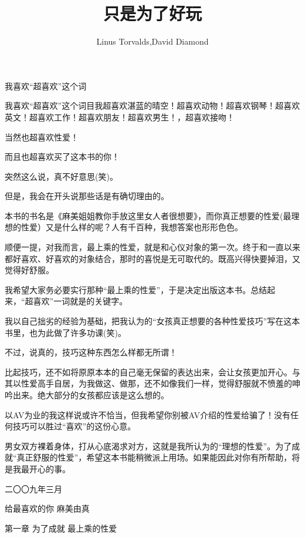 \documentclass[12pt,UTF8]{ctexbook}
\title{\heiti\zihao{0} 只是为了好玩}
\author{Linus Torvalds,David Diamond}
\date{}
\begin{document}
\maketitle
\tableofcontents

\frontmatter

\chapter{}



\mainmatter

我喜欢“超喜欢”这个词

我喜欢“超喜欢”这个词目我超喜欢湛蓝的晴空！超喜欢动物！超喜欢钢琴！超喜欢英文！超喜欢工作！超喜欢朋友！超喜欢男生！，超喜欢接吻！

当然也超喜欢性爱！

而且也超喜欢买了这本书的你！

突然这么说，真不好意思(笑)。

但是，我会在开头说那些话是有确切理由的。

本书的书名是《麻美姐姐教你手放这里女人者很想要》，而你真正想要的性爱(最理想的性爱）又是什么样的呢？人有千百种，我想答案也形形色色。

顺便一提，对我而言，最上乘的性爱，就是和心仪对象的第一次。终于和一直以来都好喜欢、好喜欢的对象结合，那时的喜悦是无可取代的。既高兴得快要掉泪，又觉得好舒服。

我希望大家务必要实行那种“最上乘的性爱”，于是决定出版这本书。总结起来，“超喜欢”一词就是的关键字。

我以自己拙劣的经验为基础，把我认为的“女孩真正想要的各种性爱技巧”写在这本书里，也为此做了许多功课(笑)。

不过，说真的，技巧这种东西怎么样都无所谓！

比起技巧，还不如将原原本本的自己毫无保留的表达出来，会让女孩更加开心。与其以性爱高手自居，为我做这、做那，还不如像我们一样，觉得舒服就不愤羞的呻吟出来。绝大部分的女孩都应该是这么想的。

以AV为业的我这样说或许不恰当，但我希望你别被AV介绍的性爱给骗了！没有任何技巧可以胜过“喜欢”的这份心意。

男女双方裸着身体，打从心底渴求对方，这就是我所认为的“理想的性爱”。为了成就“真正舒服的性爱”，希望这本书能稍微派上用场。如果能因此对你有所帮助，将是我最开心的事。



二〇〇九年三月

给最喜欢的你  麻美由真

第一章
为了成就
最上乘的性爱
\end{document}
